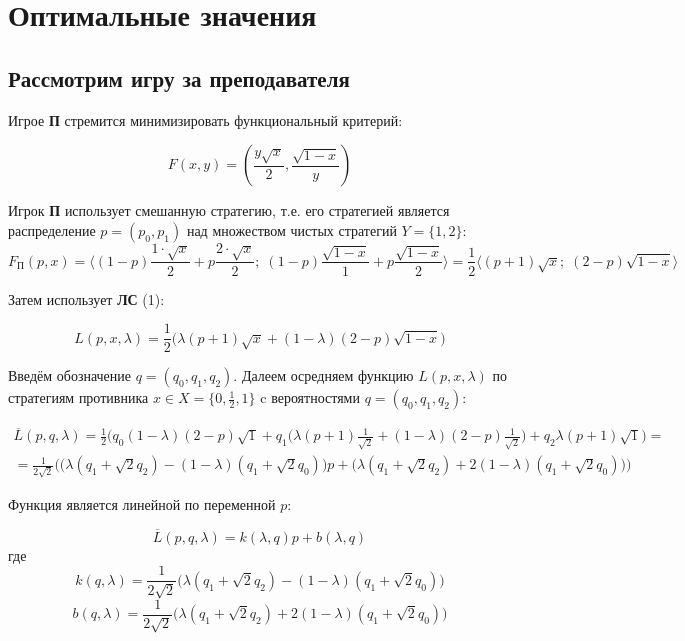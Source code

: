 \section{Оптимальные значения}

\subsection{Рассмотрим игру за преподавателя}
\begin{flushleft}

	Игрое \textbf{П} стремится минимизировать функциональный критерий: 
	
	$$F(x, y) = (\frac{y\sqrt{x}}{2},\frac{\sqrt{1-x}}{y})$$	

	Игрок \textbf{П} использует смешанную стратегию, т.е. его стратегией является
	распределение $p=(p_0,p_1)$ над множеством чистых стратегий $Y=\{1,2\}$:\\
	
	$$
	F_\textrm{П}(p,x)=
	\big \langle 
		(1-p)\frac{1 \cdot \sqrt{x}}{2} + p \frac{2 \cdot \sqrt{x}}{2}; \;
		(1-p)\frac{\sqrt{1-x}}{1}+p\frac{\sqrt{1-x}}{2} 
	\big \rangle=
	\frac{1}{2}
	\big \langle
		(p+1)\sqrt{x}; \;
		(2-p)\sqrt{1-x}
	\big \rangle
	$$
	
	Затем использует \textbf{ЛС} (1):
	
	$$
	L(p,x,\lambda)=
	\frac{1}{2}
	\big(
		\lambda(p+1)\sqrt{x} + (1-\lambda)(2-p)\sqrt{1-x}
	\big)
	$$
	
	Введём обозначение $q=(q_0,q_1,q_2)$. Далеем осредняем 
	функцию $L(p,x,\lambda)$ по стратегиям противника $x \in X=\{0,\frac{1}{2},1\}$ c 
	вероятностями $q=(q_0,q_1,q_2)$:
	
	\begin{gather*} 
	\overline{L}(p,q,\lambda)=
	\frac{1}{2} 
	\Big(
		q_0(1-\lambda)(2-p)\sqrt{1}+
		q_1 \big (\lambda(p+1)\frac{1}{\sqrt{2}} + 
		(1-\lambda)(2-p)\frac{1}{\sqrt{2}} \big )+
		q_2\lambda(p+1)\sqrt{1}
	\Big)=
	\\
	=\frac{1}{2\sqrt{2}}
	\Big (
		\big (\lambda(q_1+\sqrt{2}q_2)-(1-\lambda)(q_1+\sqrt{2}q_0) \big)p+
		\big (\lambda(q_1+\sqrt{2}q_2)+2(1-\lambda)(q_1+\sqrt{2}q_0) \big)
	\Big)
	\end{gather*}
	
	Функция является линейной по переменной $p$:
	
	$$
	\overline{L}(p,q,\lambda)=k(\lambda,q)p+b(\lambda,q)
	$$
	где
	$$
	k(q, \lambda) = \frac{1}{2\sqrt{2}}
		\big (\lambda(q_1+\sqrt{2}q_2)-(1-\lambda)(q_1+\sqrt{2}q_0) \big)
	$$
	$$
	b(q, \lambda) = \frac{1}{2\sqrt{2}}
		\big (\lambda(q_1+\sqrt{2}q_2)+2(1-\lambda)(q_1+\sqrt{2}q_0) \big)
	$$
	

\end{flushleft}
